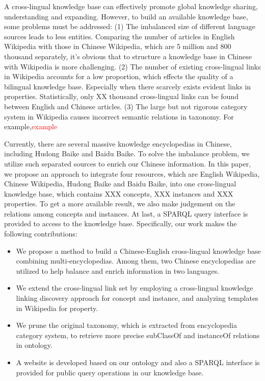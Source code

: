 \documentclass[runningheads,a4paper]{llncs}
\begin{document}
A cross-lingual knowledge base can effectively promote global knowledge sharing, understanding and expanding. However, to build an available knowledge base, some problems must be addressed: (1) The imbalanced size of different language sources leads to less entities. Comparing the number of articles in English Wikipedia with those in Chinese Wikipedia, which are 5 million and 800 thousand separately, it's obvious that to structure a knowledge base in Chinese with Wikipedia is more challenging. (2) The number of existing cross-lingual links in Wikipedia accounts for a low proportion, which effects the quality of a bilingual knowledge base. Especially when there scarcely exists evident links in properties. Statistically, only XX thousand cross-lingual links can be found between English and Chinese articles. (3) The large but not rigorous category system in Wikipedia causes incorrect semantic relations in taxonomy. For example,\textcolor{red}{example}



Currently, there are several massive knowledge encyclopedias in Chinese, including Hudong Baike and Baidu Baike. To solve the imbalance problem, we utilize such separated sources to enrich our Chinese information. In this paper, we propose an approach to integrate four resources, which are English Wikipedia, Chinese Wikipedia, Hudong Baike and Baidu Baike, into one cross-lingual knowledge base, which contains XXX concepts, XXX instances and XXX properties. To get a more available result, we also make judgement on the relations among concepts and instances. At last, a SPARQL query interface is provided to access to the knowledge base. Specifically, our work makes the following contributions:
\begin{itemize}
  \item We propose a method to build a Chinese-English cross-lingual knowledge base combining multi-encyclopedias. Among them, two  Chinese encyclopedias are utilized to help balance and enrich information in two languages.
  \item We extend the cross-lingual link set by employing a cross-lingual knowledge linking discovery approach for concept and instance, and analyzing templates in Wikipedia for property.
  \item We prune the original taxonomy, which is extracted from encyclopedia category system, to retrieve more precise subClassOf and instanceOf relations in ontology.
  \item A website is developed based on our ontology and also a SPARQL interface is provided for public query operations in our knowledge base.
\end{itemize}
\end{document}
